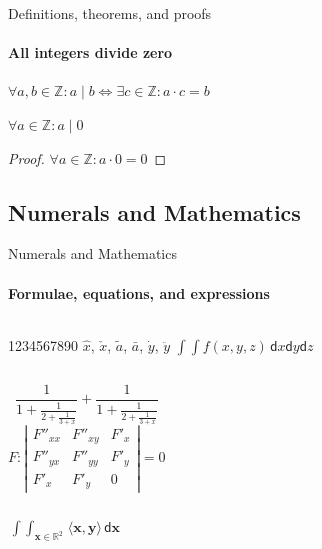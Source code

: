 \begin{darkframes}
    \begin{frame}[label=proof]{Definitions, theorems, and proofs}
      \framesubtitle{All integers divide zero}
      \begin{definition}
        $\forall a,b\in\mathds{Z}: a\mid b\iff\exists c\in\mathds{Z}:a\cdot c=b$
      \end{definition}
      \begin{theorem}
        $\forall a\in\mathds{Z}: a\mid 0$
      \end{theorem}
      \begin{proof}[Proof\nopunct]
        $\forall a\in\mathds{Z}: a\cdot 0=0$
      \end{proof}
    \end{frame}

    \subsection{Numerals and Mathematics}
    \begin{frame}[label=math]{Numerals and Mathematics}
      \framesubtitle{Formulae, equations, and expressions}
      \begin{columns}[onlytextwidth]
          1234567890
          $\hat{x}$, $\check{x}$, $\tilde{a}$,
          $\bar{a}$, $\dot{y}$, $\ddot{y}$
          $\int \!\! \int f(x,y,z)\,\mathsf{d}x\mathsf{d}y\mathsf{d}z$
      \end{columns}
      \begin{columns}[onlytextwidth]
          $$\frac{1}{\displaystyle 1+
            \frac{1}{\displaystyle 2+
            \frac{1}{\displaystyle 3+x}}} +
            \frac{1}{1+\frac{1}{2+\frac{1}{3+x}}}$$
          $$F:\left| \begin{array}{ccc}
          F''_{xx} & F''_{xy} &  F'_x \\
          F''_{yx} & F''_{yy} &  F'_y \\
          F'_x     & F'_y     & 0
          \end{array}\right| = 0$$
      \end{columns}
      \begin{columns}[onlytextwidth]
          $$\mathop{\int \!\!\! \int}_{\mathbf{x} \in \mathds{R}^2}
          \! \langle \mathbf{x},\mathbf{y}\rangle\,\mathsf{d}\mathbf{x}$$

\end{columns}
\end{frame}
\end{darkframes}
